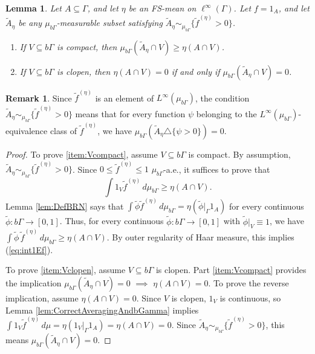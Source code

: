 \documentclass[12pt]{amsart} \usepackage{amsmath,centernot,amssymb,leftindex}
\newtheorem{lemma}[theorem]{Lemma}
\numberwithin{theorem}{section}
\numberwithin{equation}{section}
\theoremstyle{definition}
\newtheorem{remark}[theorem]{Remark}
\begin{document}
 \begin{lemma}\label{lem:OneWayEstimate}
	Let $A\subseteq \Gamma$, and let $\eta$ be an FS-mean on $\ell^{\infty}(\Gamma)$.  Let $f=1_{A}$, and let $\tilde{A}_{\eta}$ be any $\mu_{b\Gamma}$-measurable subset satisfying 
	$\tilde{A}_{\eta} \sim_{\mu_{b\Gamma}} \{\tilde{f}^{(\eta)}>0\}$.
	
	\begin{enumerate} \item\label{item:Vcompact} If $V\subseteq b\Gamma$ is compact, then $\mu_{b\Gamma}(\tilde{A}_\eta\cap V)\geq \eta(A\cap V)$.
		
		\item\label{item:Vclopen} If $V\subseteq b\Gamma$ is clopen, then $\eta(A\cap V)=0$ if and only if $\mu_{b\Gamma}(\tilde{A}_\eta \cap V)=0$.
	\end{enumerate}
\end{lemma}
\begin{remark}
	Since $\tilde{f}^{(\eta)}$ is an element of $L^{\infty}(\mu_{b\Gamma})$, the condition $\tilde{A}_{\eta}\sim_{\mu_{b\Gamma}} \{\tilde{f}^{(\eta)}>0\}$ means that for every function $\psi$  belonging to the $L^{\infty}(\mu_{b\Gamma})$-equivalence class of $\tilde{f}^{(\eta)}$, we have $\mu_{b\Gamma}(\tilde{A}_{\eta}\triangle \{\psi>0\})=0$.
\end{remark}

\begin{proof}
To prove \ref{item:Vcompact}, assume $V\subseteq b\Gamma$ is compact.	By assumption, $\tilde{A}_{\eta}\sim_{\mu_{b\Gamma}} \{\tilde{f}^{(\eta)}>0\}$. 
	Since $0\leq \tilde{f}^{(\eta)}\leq 1$ $\mu_{b\Gamma}$-a.e., it suffices to prove that 
	\begin{equation}\label{eq:int1Ef} 
		\int 1_{V} \tilde{f}^{(\eta)}\, d\mu_{b\Gamma}\geq \eta(A\cap V).
	\end{equation}  
	Lemma \ref{lem:DefBRN} says that $\int \tilde{\phi} \tilde{f}^{(\eta)}\, d\mu_{b\Gamma}=\eta(\tilde{\phi}|_{\Gamma} 1_A)$ for every continuous $\tilde{\phi}:b\Gamma\to [0,1]$.  Thus, for every continuous $\tilde{\phi}:b\Gamma\to [0,1]$ with $\tilde{\phi}|_{V}\equiv 1$, we have $\int \tilde{\phi}\, \tilde{f}^{(\eta)}\, d\mu_{b\Gamma}\geq \eta(A\cap V)$.  By outer regularity of Haar measure, this implies (\ref{eq:int1Ef}).
	
	To prove \ref{item:Vclopen}, assume $V\subseteq b\Gamma$ is clopen.  Part \ref{item:Vcompact} provides the implication $\mu_{b\Gamma}(\tilde{A}_\eta \cap V)=0$ $\implies$ $\eta(A\cap V)=0$.  To prove the reverse implication, assume $\eta(A\cap V)=0$.  Since $V$ is clopen, $1_V$ is continuous, so Lemma \ref{lem:CorrectAveragingAndbGamma} implies $\int 1_V \tilde{f}^{(\eta)}\, d\mu = \eta(1_V|_\Gamma 1_A)=\eta(A\cap V)=0$.  Since $\tilde{A}_\eta \sim_{\mu_{b\Gamma}} \{\tilde{f}^{(\eta)}>0\}$, this means $\mu_{b\Gamma}(\tilde{A}_\eta \cap V)=0$.
\end{proof}
\end{document}
